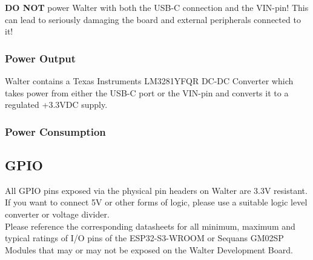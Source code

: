 \documentclass[11pt]{article}
\begin{document}
\textbf{DO NOT} power Walter with both the USB-C connection and the VIN-pin! This can lead to seriously damaging the board and external peripherals connected to it!
\subsubsection{Power Output}
Walter contains a Texas Instruments LM3281YFQR DC-DC Converter which takes power from either the USB-C port or the VIN-pin and converts it to a regulated +3.3VDC supply.
\subsubsection{Power Consumption}
\subsection{GPIO} \label{gpio}
All GPIO pins exposed via the physical pin headers on Walter are 3.3V resistant. If you want to connect 5V or other forms of logic, please use a suitable logic level converter or voltage divider.\\

Please reference the corresponding datasheets for all minimum, maximum and typical ratings of I/O pins of the ESP32-S3-WROOM or Sequans GM02SP Modules that may or may not be exposed on the Walter Development Board.

\newpage
\end{document}
